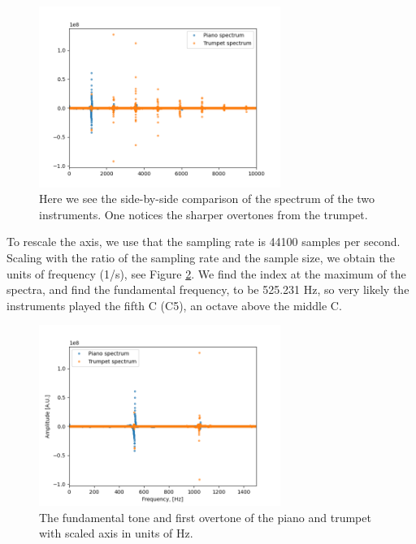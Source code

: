 \documentclass[11pt]{article}
\begin{document}
\begin{figure}[!htbp]
    \centering
    \includegraphics[width=0.7\textwidth]{pianotrumpet1.png}
    \caption{Here we see the side-by-side comparison of the spectrum of the two instruments. One notices the sharper overtones from the trumpet.}
    \label{fft1}
\end{figure}


To rescale the axis, we use that the sampling rate is 44100 samples per second. Scaling with the ratio of the sampling rate and the sample size, we obtain the units of frequency (1/s), see Figure \ref{C}. We find the index at the maximum of the spectra, and find the fundamental frequency, to be 525.231 Hz, so very likely the instruments played the fifth C (C5), an octave above the middle C.


\begin{figure}[!htbp]
    \centering
    \includegraphics[width=0.7\textwidth]{C5.png}
    \caption{The fundamental tone and first overtone of the piano and trumpet with scaled axis in units of Hz.}
    \label{C}
\end{figure}
\end{document}
